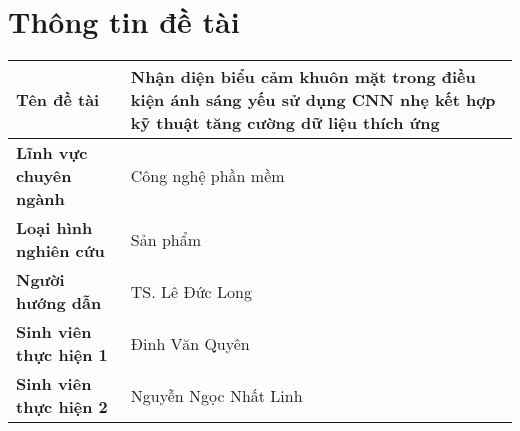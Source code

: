 \section*{Thông tin đề tài}
\begin{longtable}{|p{4cm}|p{10cm}|}
\hline
\textbf{Tên đề tài} & Nhận diện biểu cảm khuôn mặt trong điều kiện ánh sáng yếu sử dụng CNN nhẹ kết hợp kỹ thuật tăng cường dữ liệu thích ứng \\ \hline
\textbf{Lĩnh vực chuyên ngành} & Công nghệ phần mềm \\ \hline
\textbf{Loại hình nghiên cứu} & Sản phẩm \\ \hline
\textbf{Người hướng dẫn} & TS. Lê Đức Long \\ \hline
\textbf{Sinh viên thực hiện 1} & Đinh Văn Quyên \\ \hline
\textbf{Sinh viên thực hiện 2} & Nguyễn Ngọc Nhất Linh \\ \hline
\end{longtable}
